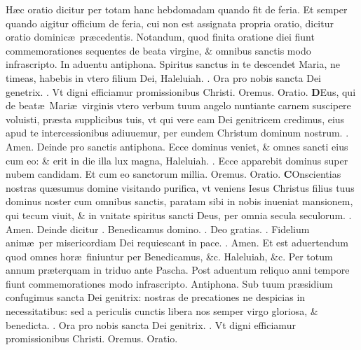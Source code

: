 \documentclass[a5paper,10pt]{book}
\def\ae{æ}
\begin{document}
\begin{multicols*}{2}
\newline \color{red} H\ae c oratio dicitur per totam hanc hebdomadam quando fit de feria. Et semper quando aigitur officium de feria, cui non est assignata propria oratio, dicitur oratio dominic\ae \ pr\ae cedentis. Notandum, quod finita oratione diei fiunt commemorationes sequentes de beata virgine, \& omnibus sanctis modo infrascripto. In aduentu antiphona. \color{black} Spiritus sanctus in te descendet Maria, ne timeas, habebis in vtero filium Dei, 
Haleluiah. \color{red} \Vbar . \color{black} Ora pro nobis sancta Dei genetrix. \color{red} \Rbar . \color{black} Vt digni efficiamur promissionibus Christi. \color{red} O\color{black}remus. \color{red} Oratio. \color{black}
\vspace{-.5em}
\lettrine[lines=2]{\bfseries \color{red} D}{}Eus, qui de beat\ae \ Mari\ae \ virginis vtero verbum tuum angelo nuntiante carnem suscipere voluisti, pr\ae sta supplicibus tuis, vt qui vere eam Dei genitricem credimus, eius apud te intercessionibus adiuuemur, per eundem Christum dominum nostrum. \color{red} \Rbar . \color{black} Amen.
\newline \color{red} Deinde pro sanctis antiphona. \color{black} Ecce dominus veniet, \& omnes sancti eius cum eo: \& erit in die illa lux magna, Haleluiah. \color{red} \Vbar . \color{black} Ecce apparebit dominus super nubem candidam. \color{red} Et cum eo sanctorum millia. \color{black} Oremus. \color{red} Oratio. \color{black}
\vspace{-.5em}
\lettrine[lines=2]{\bfseries \color{red} C}{}Onscientias nostras qu\ae sumus domine visitando purifica, vt veniens Iesus Christus filius tuus dominus noster cum omnibus sanctis, paratam sibi in nobis inueniat mansionem, qui tecum viuit, \& in vnitate spiritus sancti Deus, per omnia secula seculorum. \color{red} \Rbar . \color{black} Amen.
\newline \color{red} Deinde dicitur \Vbar . \color{black} Benedicamus domino. \color{red} \Rbar. \color{black} Deo gratias. \color{red} \Vbar . \color{black} Fidelium anim\ae \ per misericordiam Dei requiescant in pace. \color{red} \Rbar . \color{black} Amen.
\newline \color{red} Et est aduertendum quod omnes hor\ae \ finiuntur per \color{black} Benedicamus, \&c. Haleluiah, \color{red} \&c. Per totum annum pr\ae terquam in triduo ante Pascha. Post aduentum reliquo anni tempore fiunt commemorationes modo infrascripto. Antiphona. \color{black}
Sub tuum pr\ae sidium confugimus sancta Dei genitrix: nostras de precationes ne despicias in necessitatibus: sed a periculis cunctis libera nos semper virgo gloriosa, \& benedicta. \color{red} \Vbar . \color{black} Ora pro nobis sancta Dei genitrix. \color{red} \Rbar . \color{black} Vt digni efficiamur promissionibus Christi. \color{red} O\color{black}remus. \color{red} Oratio. \color{black}

\end{multicols*}
\end{document}
